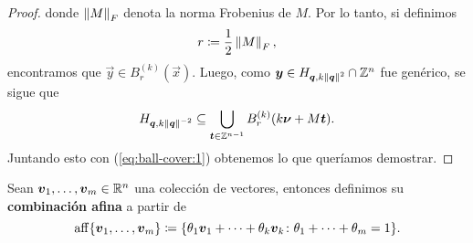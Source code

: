 \begin{proof}
	donde $\left\lVert M \right\rVert_F$ denota la norma Frobenius de $M$. Por lo tanto, si definimos
	\begin{equation}
		\label{eq:radius}
		r \coloneq \frac{1}{2}\left\lVert M \right\rVert_F,
	\end{equation}
	encontramos que $\vec{y} \in B_r^{(k)}(\vec{x})$. Luego, como $\boldsymbol{y} \in H_{\boldsymbol{q},
	k\left\lVert \boldsymbol{q} \right\rVert^2} \cap \mathbb{Z}^n$ fue genérico, se sigue que
	\begin{equation}
		\label{eq:ball-cover:2}
		H_{\boldsymbol{q}, k\left\lVert \boldsymbol{q} \right\rVert^{-2}} \subseteq
		\bigcup_{\boldsymbol{t} \in \mathbb{Z}^{n-1}}B_r^{(k)}(k\boldsymbol{\nu} + M\boldsymbol{t}).
	\end{equation}
	Juntando esto con (\ref{eq:ball-cover:1}) obtenemos lo que queríamos demostrar.
\end{proof}

\begin{definition}
	\label{def:aff}
	Sean $\boldsymbol{v}_1, \ldots, \boldsymbol{v}_m \in \mathbb{R}^n$ una colección de vectores,
	entonces definimos su \textbf{combinación afina} a partir de
	\begin{equation*}
		\operatorname{aff}\lbrace \boldsymbol{v}_1, \ldots, \boldsymbol{v}_m \rbrace \coloneq \lbrace \theta_1\boldsymbol{v}_1 + \cdots + \theta_k\boldsymbol{v}_k
		\colon \theta_1 + \cdots + \theta_m = 1 \rbrace.
	\end{equation*}
\end{definition}

